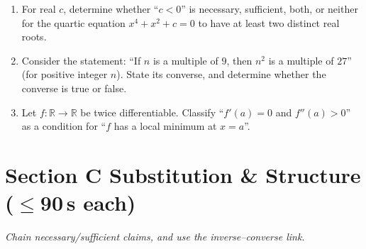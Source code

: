 \documentclass[11pt,a4paper]{article}
\begin{document}
\begin{enumerate}
\item For real $c$, determine whether ``$c < 0$'' is necessary, sufficient, both, or neither for the quartic equation $x^4 + x^2 + c = 0$ to have at least two distinct real roots.

\item Consider the statement: ``If $n$ is a multiple of $9$, then $n^2$ is a multiple of $27$'' (for positive integer $n$). State its converse, and determine whether the converse is true or false.

\item Let $f:\mathbb{R}\to\mathbb{R}$ be twice differentiable. Classify ``$f'(a) = 0$ and $f''(a) > 0$'' as a condition for ``$f$ has a local minimum at $x = a$''.

\end{enumerate}

\section*{Section C \quad Substitution \& Structure \hfill{\normalfont\small($\leq$90\,s each)}}

\noindent\textit{Chain necessary/sufficient claims, and use the inverse--converse link.}
\end{document}

